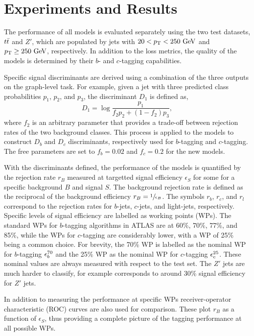\section{Experiments and Results}

The performance of all models is evaluated separately using the two test datasets, $t\bar{t}$ and $Z'$, which are populated by jets with $20 < \pt < 250~\GeV$ and $\pt \geq 250~\GeV$, respectively.
In addition to the loss metrics, the quality of the models is determined by their $b$- and $c$-tagging capabilities.

Specific signal discriminants are derived using a combination of the three outputs on the graph-level task.
For example, given a jet with three predicted class probabilities $p_1$, $p_2$, and $p_3$, the discriminant $D_1$ is defined as,
\begin{equation}
    D_1 = \log\frac{p_1}{f_2 p_2 + (1-f_2)p_3},
\end{equation}
where $f_2$ is an arbitrary parameter that provides a trade-off between rejection rates of the two background classes.
This process is applied to the models to construct $D_b$ and $D_c$ discriminants, respectively used for $b$-tagging and $c$-tagging.
The free parameters are set to $f_b=0.02$ and $f_c=0.2$ for the new models.

With the discriminants defined, the performance of the models is quantified by the rejection rate $r_B$ measured at targetted signal efficiency $\epsilon_S$ for some for a specific background $B$ and signal $S$.
The background rejection rate is defined as the reciprocal of the background efficiency $r_B = \sfrac{1}{\epsilon_B}$.
The symbols $r_b$, $r_c$, and $r_l$ correspond to the rejection rates for $b$-jets, $c$-jets, and light-jets, respectively.
Specific levels of signal efficiency are labelled as working points (WPs).
The standard WPs for $b$-tagging algorithms in \Gls{ATLAS} are at 60\%, 70\%, 77\%, and 85\%, while the WPs for $c$-tagging are considerably lower, with a WP of 25\% being a common choice.
For brevity, the 70\% WP is labelled as the nominal WP for $b$-tagging $\epsilon_b^{70}$ and the 25\% WP as the nominal WP for $c$-tagging $\epsilon_c^{25}$.
These nominal values are always measured with respect to the \ttbar test set.
The $Z'$ jets are much harder to classify, for example \bnom corresponds to around 30\% signal efficiency for $Z'$ jets.

In addition to measuring the performance at specific WPs receiver-operator characteristic (ROC) curves are also used for comparison.
These plot $r_B$ as a function of $\epsilon_S$, thus providing a complete picture of the tagging performance at all possible WPs.

